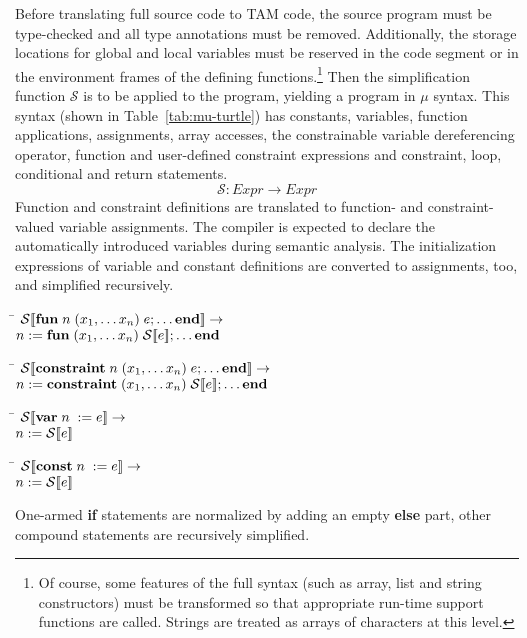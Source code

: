 Before translating full \turtle{} source code to TAM code, the source
program must be type-checked and all type annotations must be removed.
Additionally, the storage locations for global and local variables
must be reserved in the code segment or in the environment frames of
the defining functions.\footnote{Of course, some features of the full
  \turtle{} syntax (such as array, list and string constructors) must
  be transformed so that appropriate run-time support functions are
  called.  Strings are treated as arrays of characters at this level.}
Then the simplification function $\mathcal{S}$ is to be applied to the
program, yielding a program in $\mu$\turtle{} syntax. This syntax
(shown in Table~\ref{tab:mu-turtle}) has constants, variables,
function applications, assignments, array accesses, the constrainable
variable dereferencing operator, function and user-defined constraint
expressions and constraint, loop, conditional and return statements.
%
$$\mathcal{S}: Expr \rightarrow Expr$$
%
Function and constraint definitions are translated to function- and
constraint-valued variable assignments. The compiler is expected to
declare the automatically introduced variables during semantic
analysis. The initialization expressions of variable and constant
definitions are converted to assignments, too, and simplified
recursively.
%
\begin{tabbing}
\qquad \= \quad \kill
${\mathcal{S}{\normalfont [\![} \text{\bf fun}\; n\;(x_1,\dots x_n)\;e;\dots\text{\bf end} {\normalfont ]\!]}} \rightarrow$\\
\>$n :=\text{\bf fun}\; (x_1,\dots x_n)\;{\mathcal{S}{\normalfont [\![} e {\normalfont ]\!]}};\dots\text{\bf end}$
\end{tabbing}
%
\begin{tabbing}
\qquad \= \quad \kill
${\mathcal{S}{\normalfont [\![} \text{\bf constraint}\; n\;(x_1,\dots x_n)\;e;\dots\text{\bf end} {\normalfont ]\!]}} \rightarrow$\\
\>$n :=\text{\bf constraint}\; (x_1,\dots x_n)\;{\mathcal{S}{\normalfont [\![} e {\normalfont ]\!]}};\dots\text{\bf end}$
\end{tabbing}
%
\begin{tabbing}
\qquad \= \quad \kill
${\mathcal{S}{\normalfont [\![} \text{\bf var}\; n\; := e {\normalfont ]\!]}} \rightarrow$\\
\>$n := {\mathcal{S}{\normalfont [\![} e {\normalfont ]\!]}}$
\end{tabbing}
%
\begin{tabbing}
\qquad \= \quad \kill
${\mathcal{S}{\normalfont [\![} \text{\bf const}\; n\; := e {\normalfont ]\!]}} \rightarrow$\\
\>$n := {\mathcal{S}{\normalfont [\![} e {\normalfont ]\!]}}$
\end{tabbing}
%
One-armed {\bf if} statements are normalized by adding an empty {\bf
  else} part, other compound statements are recursively simplified.
